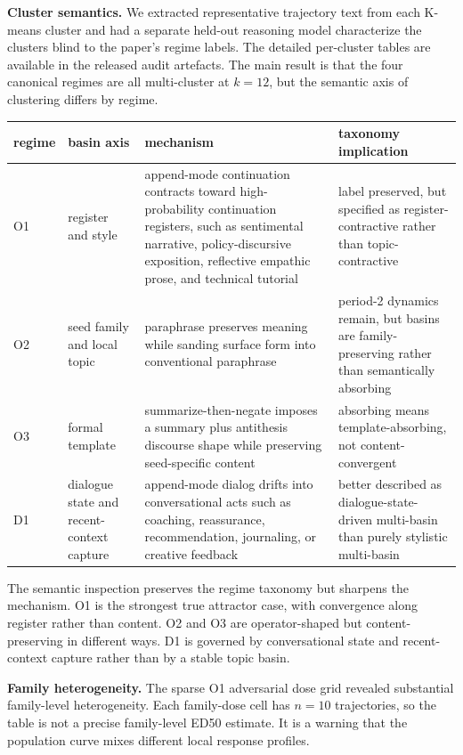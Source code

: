 \documentclass{article}
\theoremstyle{plain}
\theoremstyle{definition}
\begin{document}
\textbf{Cluster semantics.} We extracted representative trajectory text from each K-means cluster and had a separate held-out reasoning model characterize the clusters blind to the paper's regime labels. The detailed per-cluster tables are available in the released audit artefacts. The main result is that the four canonical regimes are all multi-cluster at $k=12$, but the semantic axis of clustering differs by regime.

\begin{table}[h!]
\centering
\small
\begin{tabularx}{\textwidth}{lYYY}
\toprule
regime & basin axis & mechanism & taxonomy implication \\
\midrule
O1 & register and style & append-mode continuation contracts toward high-probability continuation registers, such as sentimental narrative, policy-discursive exposition, reflective empathic prose, and technical tutorial & label preserved, but specified as register-contractive rather than topic-contractive \\
O2 & seed family and local topic & paraphrase preserves meaning while sanding surface form into conventional paraphrase & period-2 dynamics remain, but basins are family-preserving rather than semantically absorbing \\
O3 & formal template & summarize-then-negate imposes a summary plus antithesis discourse shape while preserving seed-specific content & absorbing means template-absorbing, not content-convergent \\
D1 & dialogue state and recent-context capture & append-mode dialog drifts into conversational acts such as coaching, reassurance, recommendation, journaling, or creative feedback & better described as dialogue-state-driven multi-basin than purely stylistic multi-basin \\
\bottomrule
\end{tabularx}
\end{table}

The semantic inspection preserves the regime taxonomy but sharpens the mechanism. O1 is the strongest true attractor case, with convergence along register rather than content. O2 and O3 are operator-shaped but content-preserving in different ways. D1 is governed by conversational state and recent-context capture rather than by a stable topic basin.

\textbf{Family heterogeneity.} The sparse O1 adversarial dose grid revealed substantial family-level heterogeneity. Each family-dose cell has $n=10$ trajectories, so the table is not a precise family-level ED50 estimate. It is a warning that the population curve mixes different local response profiles.
\end{document}

